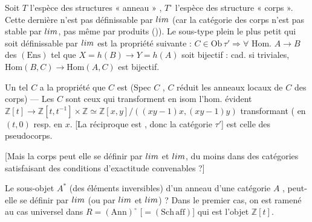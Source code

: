 \documentclass[11pt,a4paper]{article}
\begin{document}

\struck{\ill{}}  Soit $T$ l'espèce des structures
« anneau » ,
$T^{\circ}$ l'espèce des
structure « corps ». Cette dernière n'est pas définissable
par $\varprojlim$ (car la catégorie des corps
n'est pas stable par $\varprojlim$, pas même par produits
()).
Le sous-type plein  le plus petit qui soit définissable par
$\varprojlim$ est \struck{\ill{}}  la propriété suivante :
\struck{\ill{}}
$C \in \mathrm{Ob}\,\tau' \Longrightarrow \forall$ Hom. $A \to B$ des
$(\mathrm{Ens})$ tel que $X = h(B) \to Y = h(A)$ soit bijectif : cad. si
\ill{}  triviales, $\mathrm{Hom}(B, C) \to
\mathrm{Hom}(A, C)$ est bijectif.

Un tel $C$ a la propriété que $C$ est \struck{\ill{}} 
(Spec $C$  , 
$C$ réduit \uncertain{$\Longleftrightarrow$} les
 anneaux locaux de $C$ des corps) — Les $C$ sont
ceux qui transforment en isom l'hom. évident
$\mathbb{Z}[t] \to \mathbb{Z}[t, t^{-1}] \times \mathbb{Z} \simeq
\mathbb{Z}[x, y]/((xy-1)x, (xy-1)y)$
transformant ( en $(t, 0)$ resp. en $x$. [La réciproque
\ill{} est , \add{\ill{}} donc la catégorie
 $\tau'$] est celle des pseudocorps.

[Mais la \struck{\ill{}}  corps peut elle se définir par
$\varprojlim$ et $\varinjlim$, du moins dans des catégories satisfaisant
des conditions d'exactitude convenables ?]

Le sous-objet $A^{*}$ (des éléments inversibles) d'un  anneau
d'une catégorie $A$ , peut-elle se définir
par $\varprojlim$ (ou par $\varprojlim$ et $\varinjlim$) ? Dans le
premier cas, on est ramené au cas  universel dans
$R = (\mathrm{Ann})^{\circ}$ [$= (\mathrm{Sch\,aff})$] qui est
l'objet $\mathbb{Z}[t]$.
\end{document}
